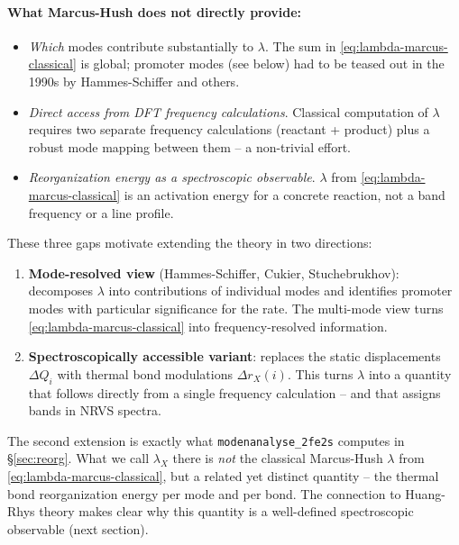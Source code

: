 \documentclass[11pt,a4paper,twoside]{article}
\theoremstyle{remark}
\begin{document}
\paragraph{What Marcus-Hush does not directly provide:}
\begin{itemize}\setlength{\itemsep}{0pt}
  \item \emph{Which} modes contribute substantially to $\lambda$.
        The sum in \eqref{eq:lambda-marcus-classical} is global;
        promoter modes (see below) had to be teased out in the
        1990s by Hammes-Schiffer and others.
  \item \emph{Direct access from DFT frequency calculations}.
        Classical computation of $\lambda$ requires two separate
        frequency calculations (reactant + product) plus a robust
        mode mapping between them -- a non-trivial effort.
  \item \emph{Reorganization energy as a spectroscopic
        observable}. $\lambda$ from
        \eqref{eq:lambda-marcus-classical} is an activation energy
        for a concrete reaction, not a band frequency or a line
        profile.
\end{itemize}

These three gaps motivate extending the theory in two directions:

\begin{enumerate}
  \item \textbf{Mode-resolved view} (Hammes-Schiffer, Cukier,
        Stuchebrukhov): decomposes $\lambda$ into contributions of
        individual modes and identifies promoter modes with
        particular significance for the rate. The multi-mode view
        turns \eqref{eq:lambda-marcus-classical} into
        frequency-resolved information.
  \item \textbf{Spectroscopically accessible variant}: replaces the
        static displacements $\Delta Q_i$ with thermal bond
        modulations $\Delta r_X(i)$. This turns $\lambda$ into a
        quantity that follows directly from a single frequency
        calculation -- and that assigns bands in NRVS spectra.
\end{enumerate}

The second extension is exactly what \texttt{modenanalyse\_2fe2s}
computes in \S\ref{sec:reorg}. What we call $\lambda_X$ there is
\emph{not} the classical Marcus-Hush $\lambda$ from
\eqref{eq:lambda-marcus-classical}, but a related yet distinct
quantity -- the thermal bond reorganization energy per mode and
per bond. The connection to Huang-Rhys theory makes clear why this
quantity is a well-defined spectroscopic observable (next section).
\end{document}
